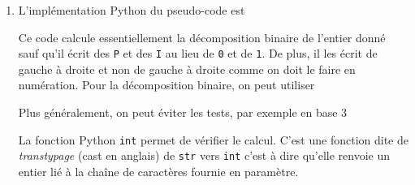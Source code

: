 \begin{enumerate}
\item L'implémentation Python du pseudo-code est

Ce code calcule essentiellement la décomposition binaire de l'entier donné sauf qu'il écrit des \texttt{P} et des \texttt{I} au lieu de \texttt{0} et de \texttt{1}. De plus, il les écrit de gauche à droite et non de gauche à droite comme on doit le faire en numération. Pour la décomposition binaire, on peut utiliser

Plus généralement, on peut éviter les tests, par exemple en base 3

La fonction Python \texttt{int} permet de vérifier le calcul. C'est une fonction dite de \emph{transtypage} (cast en anglais) de \texttt{str} vers \texttt{int} c'est à dire qu'elle renvoie un entier lié à la chaîne de caractères fournie en paramètre. 

\end{enumerate}

